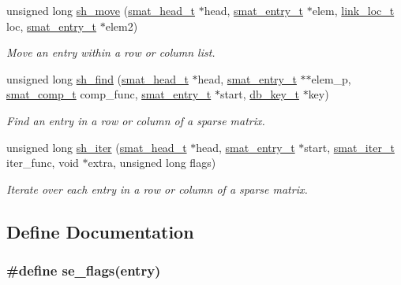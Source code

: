 \begin{CompactItemize}
unsigned long \hyperlink{group__dbprim__smat_a18}{sh\_\-move} (\hyperlink{group__dbprim__smat_a1}{smat\_\-head\_\-t} $\ast$head, \hyperlink{group__dbprim__smat_a2}{smat\_\-entry\_\-t} $\ast$elem, \hyperlink{group__dbprim__link_a4}{link\_\-loc\_\-t} loc, \hyperlink{group__dbprim__smat_a2}{smat\_\-entry\_\-t} $\ast$elem2)
\begin{CompactList}\small\item\em Move an entry within a row or column list.\item\end{CompactList}\item 
unsigned long \hyperlink{group__dbprim__smat_a19}{sh\_\-find} (\hyperlink{group__dbprim__smat_a1}{smat\_\-head\_\-t} $\ast$head, \hyperlink{group__dbprim__smat_a2}{smat\_\-entry\_\-t} $\ast$$\ast$elem\_\-p, \hyperlink{group__dbprim__smat_a5}{smat\_\-comp\_\-t} comp\_\-func, \hyperlink{group__dbprim__smat_a2}{smat\_\-entry\_\-t} $\ast$start, \hyperlink{group__dbprim_a0}{db\_\-key\_\-t} $\ast$key)
\begin{CompactList}\small\item\em Find an entry in a row or column of a sparse matrix.\item\end{CompactList}\item 
unsigned long \hyperlink{group__dbprim__smat_a20}{sh\_\-iter} (\hyperlink{group__dbprim__smat_a1}{smat\_\-head\_\-t} $\ast$head, \hyperlink{group__dbprim__smat_a2}{smat\_\-entry\_\-t} $\ast$start, \hyperlink{group__dbprim__smat_a4}{smat\_\-iter\_\-t} iter\_\-func, void $\ast$extra, unsigned long flags)
\begin{CompactList}\small\item\em Iterate over each entry in a row or column of a sparse matrix.\item\end{CompactList}\end{CompactItemize}


\subsection{Define Documentation}
\hypertarget{group__dbprim__smat_a41}{
\subsubsection[se\_\-flags]{\setlength{\rightskip}{0pt plus 5cm}\#define se\_\-flags(entry)}}
\label{group__dbprim__smat_a41}



